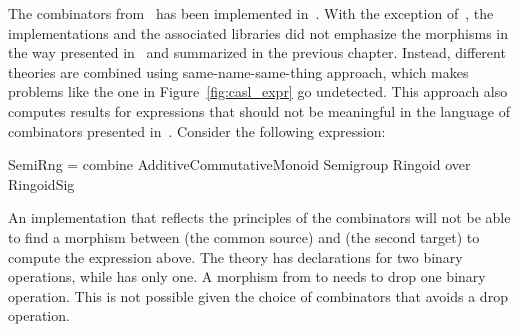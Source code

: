 \label{sec:lib_implementation}


The combinators from~\cite{carette2018building} has been implemented in~\cite{cicm2019diagrams, TPCProto, meta-prim-blog}. With the exception of~\cite{cicm2019diagrams}, the implementations and the associated libraries did not emphasize the morphisms in the way presented in~\cite{carette2018building} and summarized in the previous chapter. Instead, different theories are combined using same-name-same-thing approach, which makes problems like the one in Figure~\ref{fig:casl_expr} go undetected.  
This approach also computes results for expressions that should not be meaningful in the language of combinators presented in~\cite{carette2018building}. Consider the following expression: 
\begin{togcode}
SemiRng = combine AdditiveCommutativeMonoid Semigroup Ringoid
          over RingoidSig
\end{togcode}

An implementation that reflects the principles of the combinators will not be able to find a morphism between  (the common source) and  (the second target) to compute the expression above. 
The theory  has declarations for two binary operations, while  has only one. A morphism from  to  needs to drop one binary operation. This is not possible given the choice of combinators that avoids a drop operation. 


